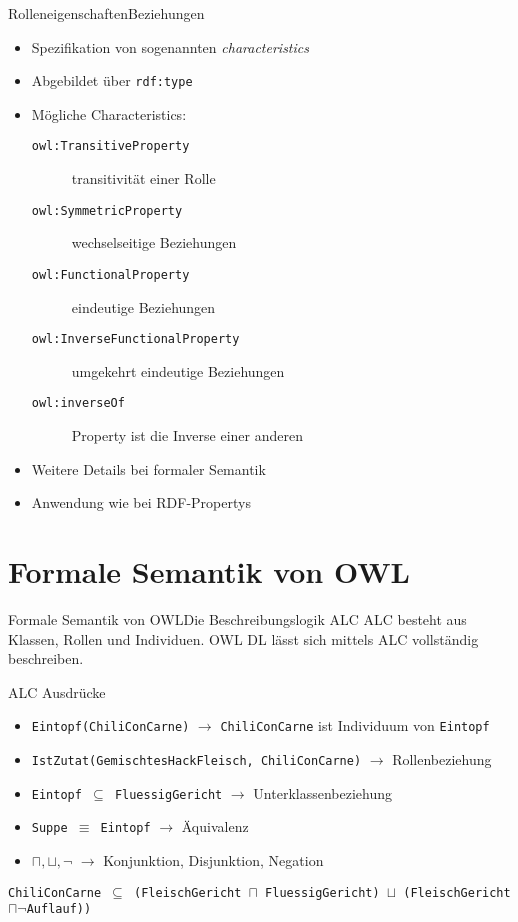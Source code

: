 \documentclass{beamer}
\begin{document}
%
\begin{frame}[fragile]{Rolleneigenschaften}{Beziehungen}
\begin{itemize}
\item Spezifikation von sogenannten \emph{characteristics}
\item Abgebildet über \texttt{rdf:type}
\item Mögliche Characteristics:
\begin{description}
\item[\texttt{owl:TransitiveProperty}] transitivität einer Rolle
\item[\texttt{owl:SymmetricProperty}] wechselseitige Beziehungen
\item[\texttt{owl:FunctionalProperty}] eindeutige Beziehungen
\item[\texttt{owl:InverseFunctionalProperty}] umgekehrt eindeutige Beziehungen
\item[\texttt{owl:inverseOf}] Property ist die Inverse einer anderen 


\end{description}
\item Weitere Details bei formaler Semantik
\item Anwendung wie bei RDF-Propertys
\end{itemize}
\end{frame}

\section{Formale Semantik von OWL}

\begin{frame}[fragile]{Formale Semantik von OWL}{Die Beschreibungslogik ALC}
ALC besteht aus Klassen, Rollen und Individuen. OWL DL lässt sich mittels ALC vollständig
beschreiben.
\begin{block}{ALC Ausdrücke}
\begin{itemize}
	\item \texttt{Eintopf(ChiliConCarne)} $ \rightarrow $ \texttt{ChiliConCarne} ist Individuum von \texttt{Eintopf} 
	\item \texttt{IstZutat(GemischtesHackFleisch, ChiliConCarne)} $ \rightarrow $ Rollenbeziehung
	\item \texttt{Eintopf $ \subseteq $ FluessigGericht} $ \rightarrow $ Unterklassenbeziehung
	\item \texttt{Suppe $ \equiv $ Eintopf} $ \rightarrow $ Äquivalenz
	\item \texttt{$ \sqcap, \sqcup, \neg $} $ \rightarrow $ Konjunktion, Disjunktion, Negation
\end{itemize}
\texttt{ChiliConCarne $ \subseteq $ (FleischGericht $ \sqcap $ FluessigGericht) $ \sqcup $ (FleischGericht $ \sqcap \neg $Auflauf))}
\end{block}
\end{frame}
\end{document}
